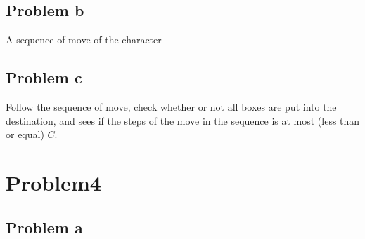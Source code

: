 \documentclass[openany]{article}
\begin{document}
\subsection*{Problem b}
A sequence of move of the character

\subsection*{Problem c}
Follow the sequence of move, check whether or not all boxes are put into the destination, and sees if the steps of the move in the sequence is at most (less than or equal) $C$.


\section*{Problem4}
\subsection*{Problem a}
\end{document}

